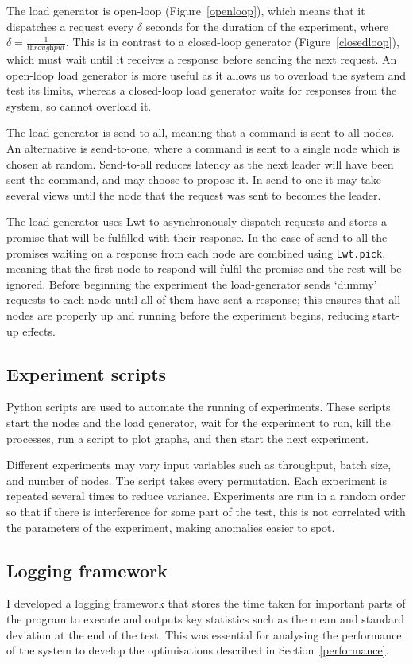 The load generator is open-loop (Figure~\ref{openloop}), which means that it dispatches a request every $\delta$ seconds for the duration of the experiment, where $\delta = \frac{1}{\textit{throughput}}$. This is in contrast to a closed-loop generator (Figure~\ref{closedloop}), which must wait until it receives a response before sending the next request. An open-loop load generator is more useful as it allows us to overload the system and test its limits, whereas a closed-loop load generator waits for responses from the system, so cannot overload it.

The load generator is send-to-all, meaning that a command is sent to all nodes. An alternative is send-to-one, where a command is sent to a single node which is chosen at random. Send-to-all reduces latency as the next leader will have been sent the command, and may choose to propose it. In send-to-one it may take several views until the node that the request was sent to becomes the leader.

The load generator uses Lwt to asynchronously dispatch requests and stores a promise that will be fulfilled with their response. In the case of send-to-all the promises waiting on a response from each node are combined using \texttt{Lwt.pick}, meaning that the first node to respond will fulfil the promise and the rest will be ignored. Before beginning the experiment the load-generator sends `dummy' requests to each node until all of them have sent a response; this ensures that all nodes are properly up and running before the experiment begins, reducing start-up effects.

\subsection{Experiment scripts} \label{experimentscripts}
Python scripts are used to automate the running of experiments. These scripts start the nodes and the load generator, wait for the experiment to run, kill the processes, run a script to plot graphs, and then start the next experiment.

Different experiments may vary input variables such as throughput, batch size, and number of nodes. The script takes every permutation. Each experiment is repeated several times to reduce variance. Experiments are run in a random order so that if there is interference for some part of the test, this is not correlated with the parameters of the experiment, making anomalies easier to spot.

\subsection{Logging framework}
I developed a logging framework that stores the time taken for important parts of the program to execute and outputs key statistics such as the mean and standard deviation at the end of the test. This was essential for analysing the performance of the system to develop the optimisations described in Section~\ref{performance}.

